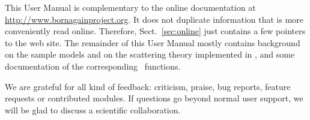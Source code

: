 This User Manual is complementary to the online documentation
at \url{http://www.bornagainproject.org}.
It does not duplicate information that is more conveniently read online.
Therefore, Sect.~\ref{sec:online} just contains a few pointers to the web site.
The remainder of this User Manual mostly contains background
on the sample models and on the scattering theory implemented in \BornAgain,
and some documentation of the corresponding \Python\ functions.


We are grateful for all kind of feedback:
criticism, praise, bug reports, feature requests or contributed modules.
If questions go beyond normal user support,
we will be glad to discuss a scientific collaboration.

